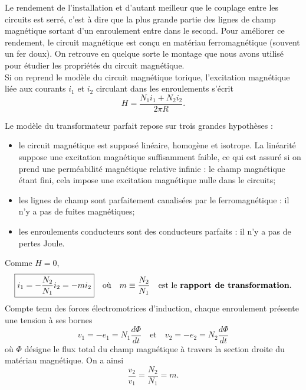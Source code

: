 \documentclass[11pt,a4paper]{report}
\begin{document}
Le rendement de l'installation et d'autant meilleur que le couplage entre les circuits est serré, c'est à dire que la plus grande partie des lignes de champ magnétique sortant d'un enroulement entre dans le second. Pour améliorer ce rendement, le circuit magnétique est conçu en matériau ferromagnétique (souvent un fer doux). On retrouve en quelque sorte le montage que nous avons utilisé pour étudier les propriétés du circuit magnétique.\\

Si on reprend le modèle du circuit magnétique torique, l'excitation magnétique liée aux courants $i_1$ et $i_2$ circulant dans les enroulements s'écrit
\begin{equation}
	H = \frac{N_1 i_1 + N_2 i_2}{2 \pi R}.
\end{equation}

Le modèle du transformateur parfait repose sur trois grandes hypothèses :
\begin{itemize}
	\item le circuit magnétique est supposé linéaire, homogène et isotrope. La linéarité suppose une 		excitation magnétique suffisamment faible, ce qui est assuré si on prend une perméabilité 				magnétique relative infinie : le champ magnétique étant fini, cela impose une excitation magnétique 	nulle dans le circuits;
	\item les lignes de champ sont parfaitement canalisées par le ferromagnétique : il n'y a pas de 		fuites magnétiques;
	\item les enroulements conducteurs sont des conducteurs parfaits : il n'y a pas de pertes Joule.\\
\end{itemize}

Comme $H = 0$,
\begin{equation}
	\boxed{i_1 = -\frac{N_2}{N_1}i_2 = - m i_2}\quad\text{où}\quad
	m \equiv \frac{N_2}{N_1}\quad\text{est le \textbf{rapport de transformation}.}	
\end{equation}
Compte tenu des forces électromotrices d'induction, chaque enroulement présente une tension à ses bornes
\begin{equation}
	v_1 = -e_1 = N_1\frac{d\Phi}{dt}\quad\text{et}\quad
	v_2 = -e_2 = N_2\frac{d\Phi}{dt}
\end{equation}
où $\Phi$ désigne le flux total du champ magnétique à travers la section droite du matériau magnétique. On a ainsi
\begin{equation}
	\frac{v_2}{v_1} = \frac{N_2}{N_1} = m.
\end{equation}
\end{document}
